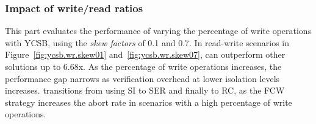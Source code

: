 

\subsubsection{Impact of write/read ratios}
\label{sec:evaluation:wr}
This part evaluates the performance of varying the percentage of write operations with YCSB, using the \textit{skew factors} of 0.1 and 0.7. 
In read-write scenarios in Figure~\ref{fig:ycsb.wr.skew01} and~\ref{fig:ycsb.wr.skew07}, \sysname can outperform other solutions up to 6.68x. As the percentage of write operations increases, the performance gap narrows as verification overhead at lower isolation levels increases. \sysname transitions from using SI to SER and finally to RC, as the FCW \cite{DBLP:journals/pvldb/ChenPLYHTLCZD24_TDSQL} strategy increases the abort rate in scenarios with a high percentage of write operations.

